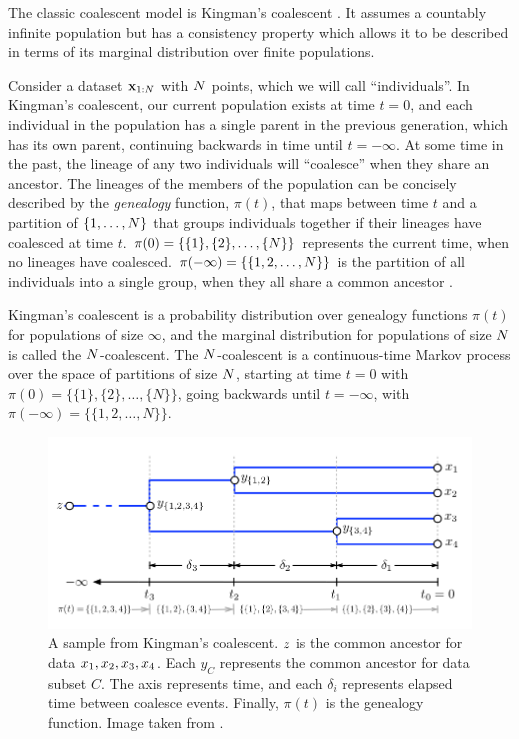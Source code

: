 The classic coalescent model is
Kingman's coalescent \citep{Kingman1982}.
It assumes a countably infinite population
but has a consistency property
which allows it to be described
in terms of its marginal distribution
over finite populations.

Consider a dataset $\mathbf{x}_{1:N}$ with $N$ points, 
which we will call ``individuals''.
In Kingman's coalescent,
our current population exists at time $t = 0$,
and each individual in the population has a single
parent in the previous generation, which has its own parent,
continuing backwards in time until
$t = -\infty$. 
At some time in the past,
the lineage of any two individuals will ``coalesce''
when they share an ancestor.
The lineages of the members of the population
can be concisely described
by the
\emph{genealogy} function, $\pi(t)$,
that maps between time $t$
and a partition of $\{1, \ldots, N\}$
that groups individuals together
if their lineages have coalesced at time $t$.
$\pi(0) = \{\{1\}, \{2\},\ldots,\{N\}\}$
represents
the current time, when no
lineages have coalesced.
$\pi(-\infty) = \{\{1, 2, \ldots, N\}\}$
is the partition of all
individuals into a single group,
when they all share a common ancestor \citep{Teh2008}.

Kingman's coalescent
is a probability distribution
over genealogy functions $\pi(t)$
for populations of size $\infty$,
and the marginal distribution for
populations of size $N$ is called the $N$-coalescent.
The $N$-coalescent
is a continuous-time
Markov process
over the space of partitions
of size $N$,
starting at time $t = 0$ with
$\pi(0) = \{\{1\}, \{2\},\ldots,\{N\}\}$,
going backwards until  $t = -\infty$,
with
$\pi(-\infty) = \{\{1, 2, \ldots, N\}\}$.

\begin{figure}[H]
  \centering
  \includegraphics[width=\textwidth]{img/trees/coalescent}
  \caption{A sample from Kingman's coalescent. $z$ is
  the common ancestor for data $x_1, x_2, x_3, x_4$. Each $y_C$
  represents the common ancestor for data subset $C$. 
  The axis represents time, and each $\delta_i$ represents elapsed time between
  coalesce events. Finally, $\pi(t)$ is
  the genealogy function. Image taken from \citet{Teh2008}.}
\label{fig:coalescent}
\end{figure}

